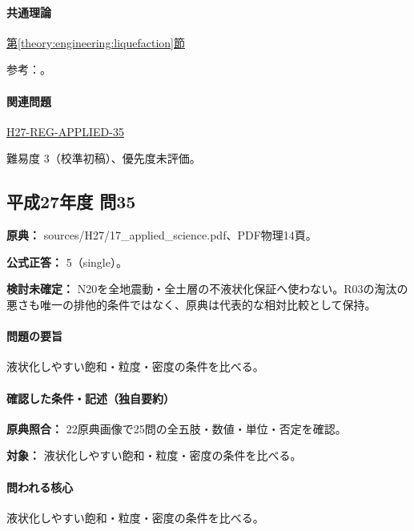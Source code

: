 \paragraph{共通理論} \hyperref[theory:engineering:liquefaction]{第\ref*{theory:engineering:liquefaction}節}

\par 参考：\cite{eng52_liquefaction,eng52_liq_sorting}。

\paragraph{関連問題} \hyperref[q:h27-reg-applied-35]{H27-REG-APPLIED-35}

\par 難易度 3（校準初稿）、優先度未評価。

\subsection{平成27年度 問35}
\label{q:h27-reg-applied-35}

\noindent\textbf{原典：} sources/H27/17\_applied\_science.pdf、PDF物理14頁。

\textbf{公式正答：} 5（single）。

\par\textbf{検討未確定：} N20を全地震動・全土層の不液状化保証へ使わない。R03の淘汰の悪さも唯一の排他的条件ではなく、原典は代表的な相対比較として保持。

\paragraph{問題の要旨} 液状化しやすい飽和・粒度・密度の条件を比べる。

\paragraph{確認した条件・記述（独自要約）}\mbox{}\par

\noindent\textbf{原典照合：} 22原典画像で25問の全五肢・数値・単位・否定を確認。\par

\noindent\textbf{対象：} 液状化しやすい飽和・粒度・密度の条件を比べる。\par

\paragraph{問われる核心} 液状化しやすい飽和・粒度・密度の条件を比べる。

